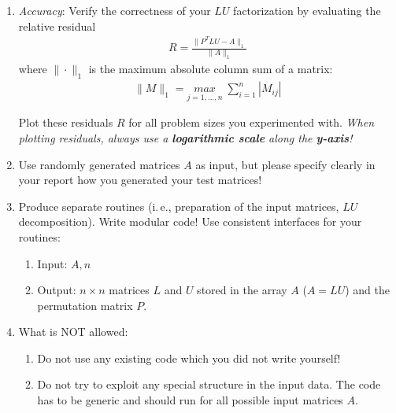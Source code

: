 \documentclass{scrartcl}
\begin{document}
    \begin{enumerate}
        \item \textit{Accuracy}: Verify the correctness of your $LU$ factorization by evaluating the relative residual
        \begin{align*}
            R = \frac{\|P^TLU - A\|_{1}}{\|A\|_{1}}
        \end{align*}
        where $\|\cdot\|_{1}$ is the maximum absolute column sum of a matrix:
        \begin{align*}
            \|M\|_{1} = \underset{j = 1, \dots, n}{max} \; \sum_{i=1}^{n} |M_{ij}|
        \end{align*}
        
        Plot these residuals $R$ for all problem sizes you experimented with.
        \emph{When plotting residuals, always use a \textbf{logarithmic scale} along the \textbf{y-axis}!}
        
        \item Use randomly generated matrices $A$ as input, but please specify clearly in your report how you generated your test matrices!
        
        \item Produce separate routines (i.\,e., preparation of the input matrices, $LU$ decomposition). Write modular code! Use consistent interfaces for your routines:
        \begin{enumerate}
            \item Input: $A, n$
            \item Output: $n \times n$ matrices $L$ and $U$ stored in the array $A$ ($A=LU$) and the permutation matrix $P$.
        \end{enumerate}
        
        
        \item What is NOT allowed:
            \begin{enumerate}
                \item Do not use any existing code which you did not write yourself!
                \item Do not try to exploit any special structure in the input data. The code has to be generic and should run for all possible input matrices $A$.
            \end{enumerate}
    \end{enumerate}
    
\end{document}
